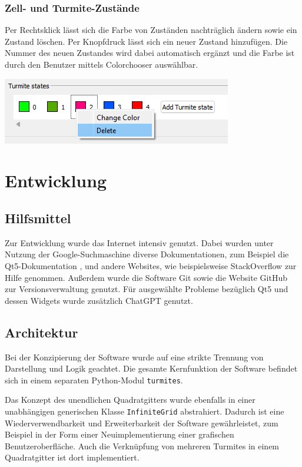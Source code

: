 \subsubsection{Zell- und Turmite-Zustände}
Per Rechtsklick lässt sich die Farbe von Zuständen nachträglich ändern sowie ein Zustand löschen. Per Knopfdruck lässt sich ein neuer Zustand hinzufügen. Die Nummer des neuen Zustandes wird dabei automatisch ergänzt und die Farbe ist durch den Benutzer mittels Colorchooser auswählbar.

\includegraphics[width=\textwidth]{context_menu_states.png}

\section{Entwicklung}
\subsection{Hilfsmittel}
Zur Entwicklung wurde das Internet intensiv genutzt. Dabei wurden unter Nutzung der Google-Suchmaschine \cite{google} diverse Dokumentationen, zum Beispiel die Qt5-Dokumentation \cite{qt5}, und andere Websites, wie beispielsweise StackOverflow \cite{stackoverflow} zur Hilfe genommen. Außerdem wurde die Software Git \cite{git} sowie die Website GitHub \cite{github} zur Versionsverwaltung genutzt. Für ausgewählte Probleme bezüglich Qt5 und dessen Widgets wurde zusätzlich ChatGPT \cite{chatgpt} genutzt.

\subsection{Architektur}
Bei der Konzipierung der Software wurde auf eine strikte Trennung von Darstellung und Logik geachtet. Die gesamte Kernfunktion der Software befindet sich in einem separaten Python-Modul \texttt{turmites}.

Das Konzept des unendlichen Quadratgitters wurde ebenfalls in einer unabhängigen generischen Klasse \texttt{InfiniteGrid} abstrahiert. Dadurch ist eine Wiederverwendbarkeit und Erweiterbarkeit der Software gewährleistet, zum Beispiel in der Form einer Neuimplementierung einer grafischen Benutzeroberfläche. Auch die Verknüpfung von mehreren Turmites in einem Quadratgitter ist dort implementiert. 

